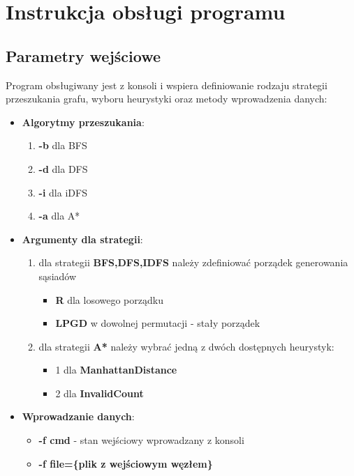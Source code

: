 \documentclass{classrep}
\begin{document}
	\section{Instrukcja obsługi programu}
		\subsection{Parametry wejściowe}
			Program obsługiwany jest z konsoli i wspiera definiowanie rodzaju strategii przeszukania grafu,
			wyboru heurystyki oraz metody wprowadzenia danych:
			\begin{itemize}
				\item \textbf{Algorytmy przeszukania}:
				\begin{enumerate}
					\item \textbf{-b} dla BFS
					\item \textbf{-d} dla DFS
					\item \textbf{-i} dla iDFS
					\item \textbf{-a} dla A*
				\end{enumerate}
				\item \textbf{Argumenty dla strategii}:
				\begin{enumerate}
					\item dla strategii \textbf{BFS,DFS,IDFS} należy zdefiniować porządek generowania sąsiadów
					\begin{itemize}
						\item \textbf{R} dla losowego porządku
						\item \textbf{LPGD} w dowolnej permutacji - stały porządek
					\end{itemize}
					\item dla strategii \textbf{A*} należy wybrać jedną z dwóch dostępnych heurystyk:
					\begin{itemize}
						\item 1 dla \textbf{ManhattanDistance}
						\item 2 dla \textbf{InvalidCount}
					\end{itemize}
				\end{enumerate}
				\item \textbf{Wprowadzanie danych}:
				\begin{itemize}
					\item \textbf{-f cmd} - stan wejściowy wprowadzany z konsoli
					\item \textbf{-f file=\{plik z wejściowym węzłem\}}
				\end{itemize}
			\end{itemize}
\end{document}
